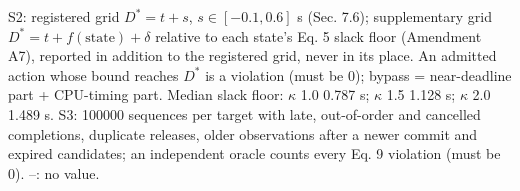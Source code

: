 \begin{table}[t]
{S2: registered grid $D^* = t + s$, $s \in [-0.1, 0.6]$ s (Sec. 7.6); supplementary grid $D^* = t + f(\mathrm{state}) + \delta$ relative to each state's Eq. 5 slack floor (Amendment A7), reported in addition to the registered grid, never in its place. An admitted action whose bound reaches $D^*$ is a violation (must be 0); bypass = near-deadline part + CPU-timing part. Median slack floor: $\kappa$ 1.0 0.787 s; $\kappa$ 1.5 1.128 s; $\kappa$ 2.0 1.489 s. 
S3: 100000 sequences per target with late, out-of-order and cancelled completions, duplicate releases, older observations after a newer commit and expired candidates; an independent oracle counts every Eq. 9 violation (must be 0). 
--: no value.
}
\end{table}
